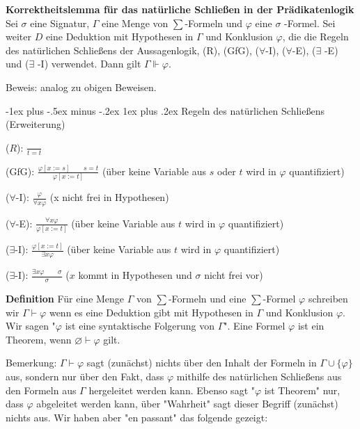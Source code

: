 \documentclass[a4paper]{article}
\makeatletter
\renewcommand{\note}[2]{\begin{noteBox} \textbf{#1} #2 \end{noteBox}}
\renewcommand{\subsubsection}{\@startsection{subsubsection}{3}{0mm}%
                {-1ex plus -.5ex minus -.2ex}%
                {1ex plus .2ex}%
                {\normalfont\small\bfseries}}
\makeatother
\begin{document}
\begin{multicols}{3}
  \note{Korrektheitslemma für das natürliche Schließen in der Prädikatenlogik}{
    Sei $\sigma$ eine Signatur, $\Gamma$ eine Menge von $\sum$-Formeln und $\varphi$ eine $\sigma$ -Formel.
    Sei weiter $D$ eine Deduktion mit Hypothesen in $\Gamma$ und Konklusion $\varphi$, die die Regeln des natürlichen Schließens der Aussagenlogik, (R), (GfG), ($\forall$-I), ($\forall$-E), ($\exists$ -E) und ($\exists$ -I) verwendet. Dann gilt $\Gamma\Vdash\varphi$.}

  Beweis: analog zu obigen Beweisen.

  \subsubsection{Regeln des natürlichen Schließens (Erweiterung)}
  \begin{itemize*}
    \item ($R$): $\frac{}{t=t}$
    \item (GfG): $\frac{\varphi[x:=s] \quad\quad s=t}{\varphi[x:=t]}$ (über keine Variable aus $s$ oder $t$ wird in $\varphi$ quantifiziert)
    \item ($\forall$-I): $\frac{\varphi}{\forall x\varphi}$ (x nicht frei in Hypothesen)
    \item ($\forall$-E): $\frac{\forall x\varphi}{\varphi[x:=t]}$ (über keine Variable aus $t$ wird in $\varphi$ quantifiziert)
    \item ($\exists$-I): $\frac{\varphi [x:=t]}{\exists x\varphi}$ (über keine Variable aus $t$ wird in $\varphi$  quantifiziert)
    \item ($\exists$-I): $\frac{\exists x\varphi\quad\quad \sigma}{\sigma}$ ($x$ kommt in Hypothesen und $\sigma$ nicht frei vor)
  \end{itemize*}

  \note{Definition}{Für eine Menge $\Gamma$ von $\sum$-Formeln und eine $\sum$-Formel $\varphi$ schreiben wir $\Gamma\vdash\varphi$ wenn es eine Deduktion gibt mit Hypothesen in $\Gamma$ und Konklusion $\varphi$. Wir sagen "$\varphi$ ist eine syntaktische Folgerung von $\Gamma$".
    Eine Formel $\varphi$ ist ein Theorem, wenn $\varnothing\vdash\varphi$ gilt.}

  Bemerkung: $\Gamma\vdash\varphi$ sagt (zunächst) nichts über den Inhalt der Formeln in $\Gamma\cup\{\varphi\}$ aus, sondern nur über den Fakt, dass $\varphi$ mithilfe des natürlichen Schließens aus den Formeln aus $\Gamma$ hergeleitet werden kann.
  Ebenso sagt "$\varphi$ ist Theorem" nur, dass $\varphi$ abgeleitet werden kann, über "Wahrheit" sagt dieser Begriff (zunächst) nichts aus.
  Wir haben aber "en passant" das folgende gezeigt:


\end{multicols}
\end{document}

